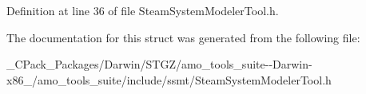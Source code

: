 Definition at line 36 of file Steam\+System\+Modeler\+Tool.\+h.



The documentation for this struct was generated from the following file\+:\begin{DoxyCompactItemize}
\item 
\+\_\+\+C\+Pack\+\_\+\+Packages/\+Darwin/\+S\+T\+G\+Z/amo\+\_\+tools\+\_\+suite-\/-\/\+Darwin-\/x86\+\_/amo\+\_\+tools\+\_\+suite/include/ssmt/Steam\+System\+Modeler\+Tool.\+h\end{DoxyCompactItemize}
